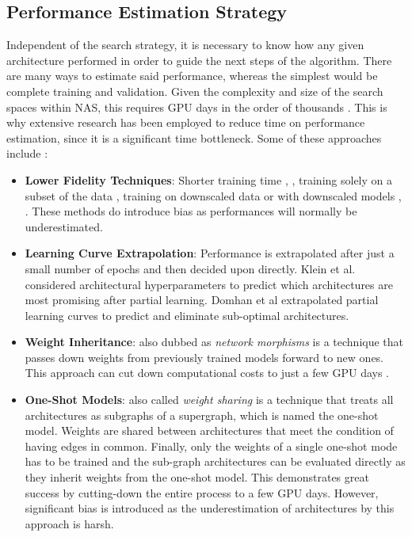 \documentclass[10pt,        %
               a4paper,     %
               journal,     %
               ]{IEEEtran}
\begin{document}
\subsection{Performance Estimation Strategy}
\label{PES}
Independent of the search strategy, it is necessary to know how any given architecture performed in order
to guide the next steps of the algorithm. There are many ways to estimate said performance, whereas the simplest
would be complete training and validation. Given the complexity and size of the search spaces within NAS, this
requires GPU days in the order of thousands \cite{wistuba2019survey}. This is why extensive research has been
employed to reduce time on performance estimation, since it is a significant time bottleneck.
Some of these approaches include \cite{wistuba2019survey}:
\begin{itemize}
    \item \textbf{Lower Fidelity Techniques}: Shorter training time \cite{zela2018towards}, \cite{zoph2018learning}, training solely on a
        subset of the data \cite{klein2018towards}, training on downscaled data \cite{chrabaszcz2017downsampled} or with downscaled
        models \cite{zoph2018learning}, \cite{pmlr-v70-real17a}. These methods do introduce bias as performances will normally be
        underestimated.

    \item \textbf{Learning Curve Extrapolation}: Performance is extrapolated after just a small number of epochs and then
        decided upon directly. Klein et al. \cite{klein2018towards} considered architectural hyperparameters to predict which
        architectures are most promising after partial learning. Domhan et al \cite{domhan2015speeding} extrapolated partial
        learning curves to predict and eliminate sub-optimal architectures.

    \item \textbf{Weight Inheritance}: also dubbed as \textit{network morphisms} is a technique that passes down weights from
        previously trained models forward to new ones. This approach can cut down computational costs to just a few GPU days
        \cite{cai2018efficient}.

    \item \textbf{One-Shot Models}: also called \textit{weight sharing} is a technique that treats all architectures as subgraphs
        of a supergraph, which is named the one-shot model. Weights are shared between architectures that meet the condition of
        having edges in common. Finally, only the weights of a single one-shot mode has to be trained and the
        sub-graph architectures can be evaluated directly as they inherit weights from the one-shot model. This demonstrates great
        success by cutting-down the entire process to a few GPU days. However, significant bias is introduced as the underestimation
        of architectures by this approach is harsh.
\end{itemize}
\end{document}
